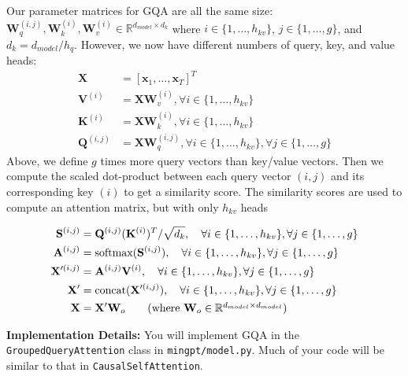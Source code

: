 \documentclass[11pt,addpoints,answers]{exam}
\newcommand{\Rb}{\mathbb{R}}
\newcommand{\xv}{\mathbf{x}}
\newcommand{\Av}{\mathbf{A}}
\newcommand{\Kv}{\mathbf{K}}
\newcommand{\Qv}{\mathbf{Q}}
\newcommand{\Sv}{\mathbf{S}}
\newcommand{\Vv}{\mathbf{V}}
\newcommand{\Wv}{\mathbf{W}}
\newcommand{\Xv}{\mathbf{X}}
\begin{document}
\begin{questions}
\begin{parts}
    Our parameter matrices for GQA are all the same size: $\Wv_q^{(i,j)},\Wv_k^{(i)},\Wv_v^{(i)} \in \Rb^{d_{model} \times d_k}$  where $i \in \{1, \ldots, h_{kv} \}$, $j \in \{1, \ldots, g \}$, and $d_k = d_{model}/h_q$. However, we now have different numbers of query, key, and value heads:
    \begin{align*}
        \Xv &= [\xv_1, \ldots, \xv_T]^T  \\
        \Vv^{(i)} &= \Xv \Wv_v^{(i)}, \forall i \in \{1, \ldots, h_{kv} \} \\
        \Kv^{(i)} &= \Xv \Wv_k^{(i)}, \forall i \in \{1, \ldots, h_{kv} \} \\
        \Qv^{(i,j)} &= \Xv \Wv_q^{(i,j)}, \forall i \in \{1, \ldots, h_{kv} \}, \forall j \in \{1, \ldots, g \} 
    \end{align*}
    Above, we define $g$ times more query vectors than key/value vectors. 
    Then we compute the scaled dot-product between each query vector $(i,j)$ and its corresponding key $(i)$ to get a similarity score. 
    The similarity scores are used to compute an attention matrix, but with only $h_{kv}$ heads
    
    \begin{align*}
        \Sv^{(i,j)} &= \Qv^{(i,j)} (\Kv^{(i)})^T / \sqrt{d_k},  \quad \forall i \in \{1, \ldots, h_{kv} \}, \forall j \in \{1, \ldots, g\} \\
        \Av^{(i,j)} &= \text{softmax}(\Sv^{(i,j)}), \quad \forall i \in \{1, \ldots, h_{kv} \}, \forall j \in \{1, \ldots, g\} \\
        \Xv'^{(i,j)} &= \Av^{(i, j)} \Vv^{(i)}, \quad \forall i \in \{1, \ldots, h_{kv} \}, \forall j \in \{1, \ldots, g\} \\
        \Xv' &= \text{concat}(\Xv'^{(i,j)}), \quad  \forall i \in \{1, \ldots, h_{kv} \}, \forall j \in \{1, \ldots, g\} \\
        \Xv &= \Xv'\Wv_o \tag{where $\Wv_o \in \Rb^{d_{model} \times d_{model}}$}
    \end{align*}

{\small 

    \textbf{Implementation Details:}
    You will implement GQA in the \lstinline{GroupedQueryAttention} class in \lstinline{mingpt/model.py}. Much of your code will be similar to that in \lstinline{CausalSelfAttention}. 

}
\end{parts}
\end{questions}
\end{document}
